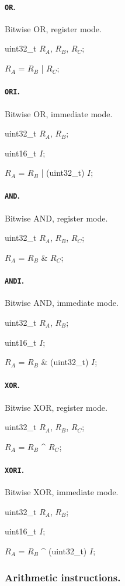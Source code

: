 \documentclass[12pt,english,twoside]{report}
\def\code{\texttt}
\def\subsubsubsection{\paragraph}
\newenvironment{codeblock}
{\begin{list}{}{
\setlength{\rightmargin}{\leftmargin}
\setlength{\listparindent}{0pt}%
\raggedright
\setlength{\itemsep}{0pt}
\setlength{\parsep}{0pt}
\normalfont\ttfamily}%
 \item[]}
{\end{list}}
\begin{document}
\subsubsubsection{\label{sec:Ins_OR}\code{OR}.}
Bitwise OR, register mode.

\begin{codeblock}
  uint32\_t $R_A$, $R_B$, $R_C$;
  
  $R_A$ = $R_B$ | $R_C$;
\end{codeblock}

\subsubsubsection{\label{sec:Ins_ORI}\code{ORI}.}
Bitwise OR, immediate mode.

\begin{codeblock}
  uint32\_t $R_A$, $R_B$;

  uint16\_t $I$;
  
  $R_A$ = $R_B$ | (uint32\_t) $I$;
\end{codeblock}

\subsubsubsection{\label{sec:Ins_AND}\code{AND}.}
Bitwise AND, register mode.

\begin{codeblock}
  uint32\_t $R_A$, $R_B$, $R_C$;
  
  $R_A$ = $R_B$ \& $R_C$;
\end{codeblock}

\subsubsubsection{\label{sec:Ins_ANDI}\code{ANDI}.}
Bitwise AND, immediate mode.

\begin{codeblock}
  uint32\_t $R_A$, $R_B$;
  
  uint16\_t $I$;
  
  $R_A$ = $R_B$ \& (uint32\_t) $I$;
\end{codeblock}

\subsubsubsection{\label{sec:Ins_XOR}\code{XOR}.}
Bitwise XOR, register mode.

\begin{codeblock}
  uint32\_t $R_A$, $R_B$, $R_C$;
  
  $R_A$ = $R_B$ \^{} $R_C$;
\end{codeblock}

\subsubsubsection{\label{sec:Ins_XORI}\code{XORI}.}
Bitwise XOR, immediate mode.

\begin{codeblock}
  uint32\_t $R_A$, $R_B$;

  uint16\_t $I$;
  
  $R_A$ = $R_B$ \^{} (uint32\_t) $I$;
\end{codeblock}

\subsubsection{Arithmetic instructions.}
\end{document}
